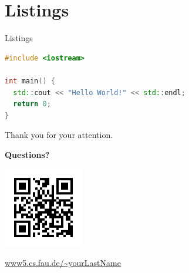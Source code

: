 \documentclass[aspectratio=43,t]{beamer}
\begin{document}
\section{Listings}
\begin{frame}[fragile]{Listings}
\begin{lstlisting}[language=C++]
#include <iostream>

int main() {
  std::cout << "Hello World!" << std::endl;
  return 0;
}
\end{lstlisting}
\end{frame}

\begin{frame}{Thank you for your attention.}
	\centering
	\vspace{1cm}

	\textbf{\large Questions?}

	\vspace{0.5cm}

	\begin{center}
		\includegraphics[height=3.5cm]{./theme/art/tf/lme/qr-lme}

		\url{www5.cs.fau.de/~yourLastName}
	\end{center}
\end{frame}
\end{document}
